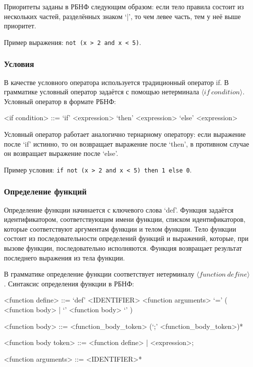 \documentclass[12pt,a4paper,oneside]{extarticle}
\begin{document}
            Приоритеты заданы в РБНФ следующим образом: если тело правила состоит из нескольких частей, разделённых знаком `|', то чем левее часть, тем у неё выше приоритет.

            Пример выражения: \lstinline$not (x > 2 and x < 5)$.

        \subsubsection{Условия}
            В качестве условного оператора используется традиционный оператор if. В грамматике условный оператор задаётся с помощью нетерминала $\langle if~condition \rangle$. Условный оператор в формате РБНФ:
            \begin{grammar}
                <if condition> ::= `if' <expression> `then' <expression> `else' <expression>
            \end{grammar}
            Условный оператор работает аналогично тернарному оператору: если выражение после `if' истинно, то он возвращает выражение после `then', в противном случае он возвращает выражение после `else'.

            Пример условия: \lstinline$if not (x > 2 and x < 5) then 1 else 0$.

        \subsubsection{Определение функций}
            Определение функции начинается с ключевого слова `def'.
            Функция задаётся идентификатором, соответствующим имени функции, списком идентификаторов, которые соответствуют аргументам функции и телом функции.
            Тело функции состоит из последовательности определений функций и выражений, которые, при вызове функции, последовательно исполняются.
            Функция возвращает результат последнего выражения из тела функции.

            В грамматике определение функции соответствует нетерминалу $\langle function~define \rangle$. Синтаксис определения функции в РБНФ:

            \begin{grammar}
                <function define> ::= `def' <IDENTIFIER> <function arguments> `=' ( <function body> | `{' <function body> `}' )

                <function body> ::= <function_body_token> (`;' <function_body_token>)*

                <function body token> ::= <function define> | <expression>;

                <function arguments> ::= <IDENTIFIER>*
            \end{grammar}
\end{document}
